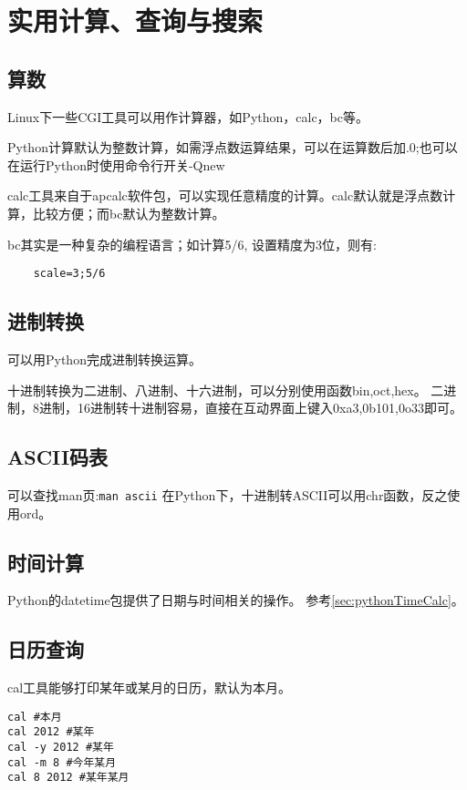 \section{实用计算、查询与搜索}

\subsection{算数}
Linux下一些CGI工具可以用作计算器，如Python，calc，bc等。

Python计算默认为整数计算，如需浮点数运算结果，可以在运算数后加.0;也可以在运行Python时使用命令行开关-Qnew

calc工具来自于apcalc软件包，可以实现任意精度的计算。calc默认就是浮点数计算，比较方便；而bc默认为整数计算。

bc其实是一种复杂的编程语言；如计算5/6, 设置精度为3位，则有:
\begin{verbatim}
	scale=3;5/6
\end{verbatim}

\subsection{进制转换}
可以用Python完成进制转换运算。

十进制转换为二进制、八进制、十六进制，可以分别使用函数bin,oct,hex。 
二进制，8进制，16进制转十进制容易，直接在互动界面上键入0xa3,0b101,0o33即可。

\subsection{ASCII码表}
可以查找man页:\verb+man ascii+
在Python下，十进制转ASCII可以用chr函数，反之使用ord。

\subsection{时间计算} 
Python的datetime包提供了日期与时间相关的操作。 参考\ref{sec:pythonTimeCalc}。



\subsection{日历查询}
cal工具能够打印某年或某月的日历，默认为本月。
\begin{verbatim}
cal #本月
cal 2012 #某年
cal -y 2012 #某年
cal -m 8 #今年某月
cal 8 2012 #某年某月
\end{verbatim}

